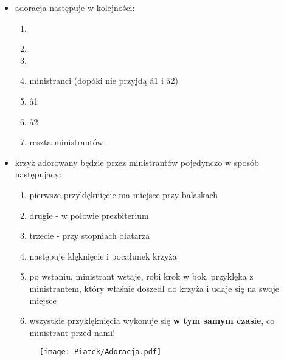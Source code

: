 \begin{itemize}
    \item adoracja następuje w kolejności:

          \begin{enumerate}\centering
              \item[] \ii~
              \item[] 
              \item[] 
              \item[] ministranci (dopóki nie przyjdą \aa1 i \aa2)
              \item[] \aa1
              \item[] \aa2
              \item[] reszta ministrantów
          \end{enumerate}

    \item krzyż adorowany będzie przez ministrantów pojedynczo w sposób
          następujący:

          \begin{enumerate}[leftmargin=1cm]
              \item pierwsze przyklęknięcie ma miejsce przy balaskach
              \item drugie - w połowie prezbiterium
              \item trzecie - przy stopniach ołatarza
              \item następuje klęknięcie i pocałunek krzyża
              \item po wstaniu, ministrant wstaje, robi krok w bok, przyklęka z
                    ministrantem, który właśnie doszedł do krzyża  i udaje się
                    na swoje miejsce
              \item wszystkie przyklęknięcia wykonuje się \textbf{w tym samym
                        czasie}, co ministrant przed nami!
          \end{enumerate}

          \begin{figure}[h]
              \centering
              \texttt{[image: Piatek/Adoracja.pdf]}
          \end{figure}


\end{itemize}
